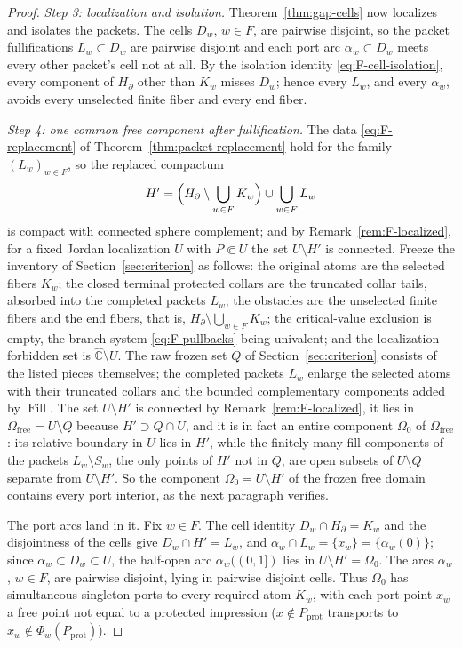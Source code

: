 \documentclass[11pt,reqno]{amsart}
\theoremstyle{definition}
\theoremstyle{remark}
\newcommand{\Chat}{\widehat{\mathbb C}}
\newcommand{\Fill}{\operatorname{Fill}}
\newcommand{\Omfree}{\Omega_{\mathrm{free}}}
\begin{document}
\begin{proof}
\emph{Step 3: localization and isolation.}
Theorem~\ref{thm:gap-cells} now localizes and isolates the packets.  The
cells $D_w$, $w\in F$, are pairwise disjoint, so the packet
fullifications $L_w\subset D_w$ are pairwise disjoint and each port arc
$\alpha_w\subset D_w$ meets every other packet's cell not at all.  By the
isolation identity \eqref{eq:F-cell-isolation}, every component of
$H_\partial$ other than $K_w$ misses $D_w$; hence every $L_w$, and every
$\alpha_w$, avoids every unselected finite fiber and every end fiber.

\emph{Step 4: one common free component after fullification.}
The data \eqref{eq:F-replacement} of
Theorem~\ref{thm:packet-replacement} hold for the family
$(L_w)_{w\in F}$, so the replaced compactum
\[
H'=\Bigl(H_\partial\setminus\bigcup_{w\in F}K_w\Bigr)
\cup\bigcup_{w\in F}L_w
\]
is compact with connected sphere complement; and by
Remark~\ref{rem:F-localized}, for a fixed Jordan localization $U$ with
$P\Subset U$ the set $U\setminus H'$ is connected.  Freeze the
inventory of Section~\ref{sec:criterion} as follows: the original atoms
are the selected fibers $K_w$; the closed terminal protected collars are
the truncated collar tails, absorbed into the completed packets $L_w$;
the obstacles are the unselected finite fibers and the end fibers, that
is, $H_\partial\setminus\bigcup_{w\in F}K_w$; the critical-value
exclusion is empty, the branch system \eqref{eq:F-pullbacks} being
univalent; and the localization-forbidden set is $\Chat\setminus U$.
The raw frozen set $Q$ of Section~\ref{sec:criterion} consists of the
listed pieces themselves; the completed packets $L_w$ enlarge the
selected atoms with their truncated collars and the bounded
complementary components added by $\Fill$.  The set $U\setminus H'$ is
connected by Remark~\ref{rem:F-localized}, it lies in
$\Omfree=U\setminus Q$ because $H'\supset Q\cap U$, and it is in fact an
entire component $\Omega_0$ of $\Omfree$: its relative boundary in $U$
lies in $H'$, while the finitely many fill components of the packets
$L_w\setminus S_w$, the only points of $H'$ not in $Q$, are open subsets
of $U\setminus Q$ separate from $U\setminus H'$.  So the component
$\Omega_0=U\setminus H'$ of the frozen free domain contains every port
interior, as the next paragraph verifies.

The port arcs land in it.  Fix $w\in F$.  The cell identity
$D_w\cap H_\partial=K_w$ and the disjointness of the cells give
$D_w\cap H'=L_w$, and $\alpha_w\cap L_w=\{x_w\}=\{\alpha_w(0)\}$; since
$\alpha_w\subset D_w\subset U$, the half-open arc
$\alpha_w((0,1])$ lies in $U\setminus H'=\Omega_0$.  The arcs
$\alpha_w$, $w\in F$, are pairwise disjoint, lying in pairwise disjoint
cells.  Thus $\Omega_0$ has simultaneous singleton ports to every
required atom $K_w$, with each port point $x_w$ a free point not equal
to a protected impression
($x\notin P_{\mathrm{prot}}$ transports to
$x_w\notin\Phi_w(P_{\mathrm{prot}})$).


\end{proof}
\end{document}

